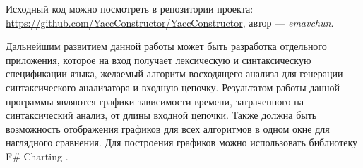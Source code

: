 \documentclass[14pt]{matmex-diploma}
\begin{document}
Исходный код можно посмотреть в репозитории проекта: \newline \href{https://github.com/YaccConstructor/YaccConstructor}{https://github.com/YaccConstructor/YaccConstructor}, автор — \textit{emavchun}.

Дальнейшим развитием данной работы может быть разработка отдельного приложения, которое на вход получает лексическую и синтаксическую спецификации языка, желаемый алгоритм восходящего анализа для генерации синтаксического анализатора и входную цепочку. Результатом работы данной программы являются графики зависимости времени, затраченного на синтаксический анализ, от длины входной цепочки. Также должна быть возможность отображения графиков для всех алгоритмов в одном окне для наглядного сравнения. Для построения графиков можно использовать библиотеку F# Charting \cite{link:fSharpCharting}.


\setmonofont[Mapping=tex-text]{CMU Typewriter Text}


\end{document}
